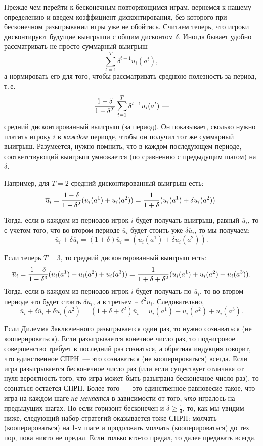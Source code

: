 Прежде чем перейти к бесконечным повторяющимся играм, вернемся к
нашему определению и введем коэффициент дисконтирования, без
которого при бесконечном разыгрывании игры уже не обойтись. Считаем
теперь, что игроки дисконтируют будущие выигрыши с общим дисконтом
$\delta$. Иногда бывает удобно рассматривать не просто суммарный выигрыш
$$
\sum^T_{t=1}\delta^{t-1}u_i(a^t),
$$
а нормировать его для того, чтобы рассматривать среднюю полезность
за период, т.\,е.
$$
{{1-\delta}\over{1-\delta^T}}\sum^T_{t=1}\delta^{t-1}u_i(a^t)~\mbox{---}
$$
средний дисконтированный выигрыш (за период).
Он показывает, сколько нужно платить игроку $i$ в {\it каждом}
периоде, чтобы он получил тот же суммарный выигрыш. Разумеется,
нужно помнить, что в каждом последующем периоде, соответствующий
выигрыш умножается (по сравнению с предыдущим шагом) на $\delta$.

Например, для $T=2$ средний дисконтированный выигрыш есть:
$$\overline{u}_i={{1-\delta}\over{1-\delta^2}}(u_i(a^1)+u_i(a^2))=
{{1}\over{1+\delta}}(u_i(a^1)+\delta u_i(a^2)).$$

Тогда, если в каждом из периодов игрок $i$ будет получать выигрыш,
равный $\overline{u}_i$, то с учетом того, что во втором периоде
$\overline{u}_i$ будет стоить уже $\delta\overline{u}_i$, то мы получаем:
$$\overline{u}_i+\delta\overline{u}_i=(1+\delta)\overline{u}_i=
(u_i(a^1)+\delta u_i(a^2)).$$

Если теперь $T=3$, то средний дисконтированный выигрыш есть:
$$\overline{u}_i={{1-\delta}\over{1-\delta^3}}(u_i(a^1)+u_i(a^2)+u_i(a^3))=
{{1}\over{1+\delta+\delta^2}}(u_i(a^1)+u_i(a^2)+u_i(a^3)).$$
Тогда, если в каждом из периодов игрок $i$ будет получать по $\overline{u}_i$,
то во втором периоде это будет стоить $\delta\overline{u}_i$, а в третьем --
$\delta^2\overline{u}_i$. Следовательно,
$$\overline{u}_i+\delta\overline{u}_i+\delta u_i(a^2)=(1+\delta+\delta^2)\overline{u}_i=
u_i(a^1)+u_i(a^2)+u_i(a^3).$$

Если Дилемма Заключенного разыгрывается один раз, то  нужно
сознаваться (не кооперироваться). Если разыгрывается конечное число раз,
то под-игровое совершенство требует в последний раз
сознаться, а обратная индукция говорит, что единственное
СПРH~--- это сознаваться (не кооперироваться) всегда. Если игра разыгрывается
бесконечное число раз (или если существует отличная от нуля вероятность
того, что игра может быть разыграна бесконечное число раз), то сознаться
остается СПРH.  Более
того~--- это единственное равновесие такое, что игра на каждом шаге
{\it не меняется} в зависимости от того, \emph{что} игралось на предыдущих
шагах. Hо если горизонт бесконечен и $\delta \ge \frac{1}{4}$, то, как мы увидим
ниже, следующий набор стратегий оказывается тоже СПРH: молчать
(кооперироваться) на 1-м шаге и продолжать молчать
(кооперироваться) до тех пор, пока никто не предал. Если только кто-то
предал, то далее предавать всегда.
\smallskip

